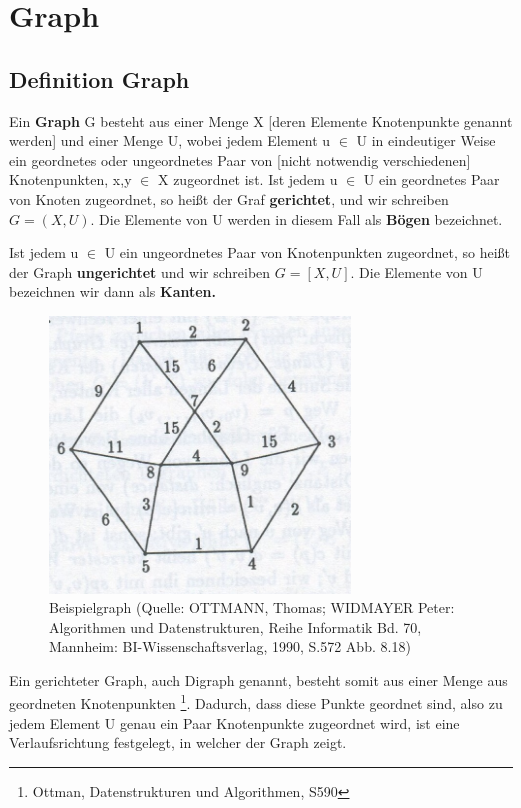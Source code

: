 
\chapter{Graph}

\section{Definition Graph}


\begin{theorem}
Ein \textbf{Graph} G besteht aus einer Menge X [deren Elemente Knotenpunkte genannt werden] und einer Menge U, wobei jedem Element u $\in$ U in eindeutiger Weise ein geordnetes oder ungeordnetes Paar von [nicht notwendig verschiedenen] Knotenpunkten, x,y $\in$ X zugeordnet ist.
Ist jedem u $\in$ U ein geordnetes Paar von Knoten zugeordnet, so heißt der Graf \textbf{gerichtet}, und wir schreiben 
	$G= (X, U)$.
Die Elemente von U werden in diesem Fall als \textbf{Bögen} bezeichnet.

Ist jedem u $\in$ U ein ungeordnetes Paar von Knotenpunkten zugeordnet, so heißt der Graph \textbf{ungerichtet} und wir schreiben 
	$G=[X,U]$. 
Die Elemente von U bezeichnen wir dann als \textbf{Kanten.} \\
\cite[S. 9]{Biess09} 	%
\end{theorem} 

\begin{figure}[h]
\centering
\includegraphics[width = 8cm]{./chapters/Graph.jpg}
\caption{Beispielgraph {\tiny (Quelle: OTTMANN, Thomas; WIDMAYER Peter: Algorithmen und Datenstrukturen, Reihe Informatik Bd. 70, Mannheim: BI-Wissenschaftsverlag, 1990, S.572 Abb. 8.18)} }
\label{a1}
\end{figure}


Ein gerichteter Graph, auch Digraph genannt,  besteht somit aus einer Menge aus geordneten Knotenpunkten \footnote{Ottman, Datenstrukturen und Algorithmen, S590}. Dadurch, dass diese Punkte geordnet sind, also zu jedem Element U genau ein Paar Knotenpunkte zugeordnet wird, ist eine Verlaufsrichtung festgelegt, in welcher der Graph zeigt.

